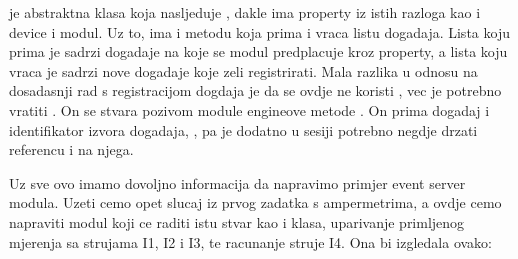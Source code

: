 \documentclass[letterpaper,10pt,croatian]{sphinxmanual}
\begin{document}
\sphinxAtStartPar
{} je abstraktna klasa koja nasljeduje ,
dakle ima property  iz istih razloga kao i device i modul. Uz
to, ima i metodu  koja prima i vraca listu dogadaja. Lista koju
prima je sadrzi dogadaje na koje se modul predplacuje kroz 
property, a lista koju vraca je sadrzi nove dogadaje koje zeli registrirati.
Mala razlika u odnosu na dosadasnji rad s registracijom dogdaja je da se ovdje
ne koristi , vec je potrebno vratiti
. On se stvara pozivom module engineove
metode . On prima dogadaj i identifikator izvora
dogadaja, ,
pa je dodatno u sesiji potrebno negdje drzati referencu i na njega.

\sphinxAtStartPar
Uz sve ovo imamo dovoljno informacija da napravimo primjer event server modula.
Uzeti cemo opet slucaj iz prvog zadatka s ampermetrima, a ovdje cemo napraviti
modul koji ce raditi istu stvar kao i  klasa, uparivanje
primljenog mjerenja sa strujama I1, I2 i I3, te racunanje struje I4. Ona bi
izgledala ovako:
\end{document}
